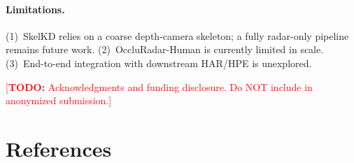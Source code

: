 \documentclass{article}
\newcommand{\todo}[1]{\textcolor{red}{[\textbf{TODO:} #1]}}
\begin{document}
\paragraph{Limitations.}
(1)~SkelKD relies on a coarse depth-camera skeleton; a fully radar-only pipeline
remains future work.
(2)~OccluRadar-Human is currently limited in scale.
(3)~End-to-end integration with downstream HAR/HPE is unexplored.

\begin{ack}
\todo{Acknowledgments and funding disclosure. Do NOT include in anonymized submission.}
\end{ack}

\section*{References}
\end{document}
